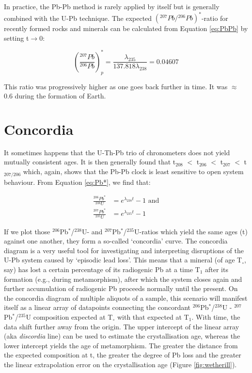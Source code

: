 \documentclass{book}
\begin{document}
In practice, the Pb-Pb method is rarely applied by itself but is
generally combined with the U-Pb technique. The expected
$({}^{207}Pb/{}^{206}Pb)^*$-ratio for recently formed rocks and minerals
can be calculated from Equation \ref{eq:PbPb} by setting
t$\rightarrow$0:

\begin{equation}
  \left(\frac{^{207}Pb}{^{206}Pb}\right)^*_p =
  \frac{\lambda_{235}}{137.818\lambda_{238}} = 0.04607
\label{eq:commonPb}
\end{equation}

This ratio was progressively higher as one goes back further in time.
It was $\approx$ 0.6 during the formation of Earth.

\section{Concordia}
\label{sec:concordia}

It sometimes happens that the U-Th-Pb trio of chronometers does not
yield mutually consistent ages. It is then generally found that
t$_{208}$ $<$ t$_{206}$ $<$ t$_{207}$ $<$ t$_{207/206}$ which, again,
shows that the Pb-Pb clock is least sensitive to open system
behaviour.  From Equation \ref{eq:Pb*}, we find that:

\begin{equation}
\begin{array}{rl}
\frac{^{206}Pb^*}{^{238}U} & = e^{\lambda_{238}t}-1 \mbox{~and}\\
\frac{^{207}Pb^*}{^{235}U} & = e^{\lambda_{235}t}-1
\end{array}
\label{eq:wetherill}
\end{equation}

If we plot those $^{206}$Pb$^*$/$^{238}$U- and
$^{207}$Pb$^*$/$^{235}$U-ratios which yield the same ages (t) against
one another, they form a so-called `concordia' curve. The concordia
diagram is a very useful tool for investigating and interpreting
disruptions of the U-Pb system caused by `episodic lead loss'. This
means that a mineral (of age T$_\circ$, say) has lost a certain
percentage of its radiogenic Pb at a time T$_1$ after its formation
(e.g., during metamorphism), after which the system closes again and
further accumulation of radiogenic Pb proceeds normally until the
present.  On the concordia diagram of multiple aliquots of a sample,
this scenario will manifest itself as a linear array of datapoints
connecting the concordant $^{206}$Pb$^*$/$^{238}$U -
$^{207}$Pb$^*$/$^{235}$U composition expected at T$_\circ$ with that
expected at T$_1$.  With time, the data shift further away from the
origin.  The upper intercept of the linear array (aka \emph{discordia}
line) can be used to estimate the crystallisation age, whereas the
lower intercept yields the age of metamorphism.  The greater the
distance from the expected composition at t, the greater the degree of
Pb loss and the greater the linear extrapolation error on the
crystallisation age (Figure \ref{fig:wetherill}).
\end{document}
